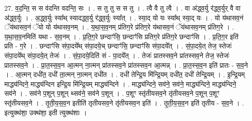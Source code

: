 \documentclass[17pt]{extarticle}
\begin{document}
27. व॒द॒न्ति॒ स स व॑दन्ति वदन्ति॒ सः । . स तु तु स स तु । . त्वै वै तु त्वै । . वा अ॑द्ध्व॒र्यु र॑द्ध्व॒र्युर् वै वा अ॑द्ध्व॒र्युः । . अ॒द्ध्व॒र्युः स्या᳚थ् स्यादद्ध्व॒र्यु र॑द्ध्व॒र्युः स्या᳚त् । . स्या॒द् यो यः स्या᳚थ् स्या॒द् यः । . यो य॑थासव॒नं ॅय॑थासव॒नं ॅयो यो य॑थासव॒नम् । . य॒था॒स॒व॒नम् प्र॑तिग॒रे प्र॑तिग॒रे य॑थासव॒नं ॅय॑थासव॒नम् प्र॑तिग॒रे । . य॒था॒स॒व॒नमिति॑ यथा - स॒व॒नम् । . प्र॒ति॒ग॒रे छन्दाꣳ॑सि॒ छन्दाꣳ॑सि प्रतिग॒रे प्र॑तिग॒रे छन्दाꣳ॑सि । . प्र॒ति॒ग॒र इति॑ प्रति - ग॒रे । . छन्दाꣳ॑सि संपा॒दये᳚थ् संपा॒दये॒च् छन्दाꣳ॑सि॒ छन्दाꣳ॑सि संपा॒दये᳚त् । . सं॒पा॒दये॒त् तेज॒ स्तेजः॑ संपा॒दये᳚थ् संपा॒दये॒त् तेजः॑ । . सं॒पा॒दये॒दिति॑ सं - पा॒दये᳚त् । . तेजः॑ प्रातस्सव॒ने प्रा॑तस्सव॒ने तेज॒ स्तेजः॑ प्रातस्सव॒ने । . प्रा॒त॒स्स॒व॒न आ॒त्मन् ना॒त्मन् प्रा॑तस्सव॒ने प्रा॑तस्सव॒न आ॒त्मन्न् । . प्रा॒त॒स्स॒व॒न इति॑ प्रातः - स॒व॒ने । . आ॒त्मन् दधी॑त॒ दधी॑ ता॒त्मन् ना॒त्मन् दधी॑त । . दधी॑ तेन्द्रि॒य मि॑न्द्रि॒यम् दधी॑त॒ दधी॑ तेन्द्रि॒यम् । . इ॒न्द्रि॒यम् माद्ध्य॑न्दिने॒ माद्ध्य॑न्दिन इन्द्रि॒य मि॑न्द्रि॒यम् माद्ध्य॑न्दिने । . माद्ध्य॑न्दिने॒ सव॑ने॒ सव॑ने॒ माद्ध्य॑न्दिने॒ माद्ध्य॑न्दिने॒ सव॑ने । . सव॑ने प॒शून् प॒शून् थ्सव॑ने॒ सव॑ने प॒शून् । . प॒शूꣳ स्तृ॑तीयसव॒ने तृ॑तीयसव॒ने प॒शून् प॒शूꣳ स्तृ॑तीयसव॒ने । . तृ॒ती॒य॒स॒व॒न इतीति॑ तृतीयसव॒ने तृ॑तीयसव॒न इति॑ । . तृ॒ती॒य॒स॒व॒न इति॑ तृतीय - स॒व॒ने । . इत्युक्थ॑शा॒ उक्थ॑शा॒ इती त्युक्थ॑शाः । \newline
\end{document}
